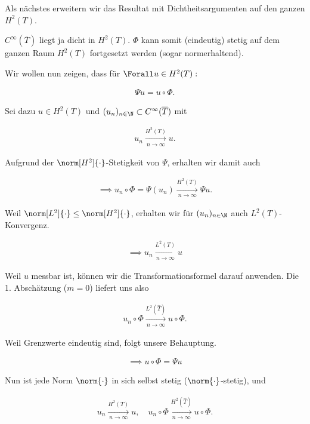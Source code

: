 \begin{solution}
Als nächstes erweitern wir das Resultat mit Dichtheitsargumenten auf den ganzen $H^2(T)$.

$C^{\infty}(\overline{T})$ liegt ja dicht in $H^2(T)$.
$\Phi$ kann somit (eindeutig) stetig auf dem ganzen Raum $H^2(T)$ fortgesetzt werden
(sogar normerhaltend).

Wir wollen nun zeigen, dass für $\Forall u \in H^2(T):$

\begin{align*}
  \Psi u = u \circ \Phi.
\end{align*}

Sei dazu $u \in H^2(T)$ und $(u_n)_{n \in \N} \subset C^{\infty}(\overline{T})$ mit

\begin{align*}
  u_n \xrightarrow[n \to \infty]{H^2(T)} u.
\end{align*}

Aufgrund der $\norm[H^2]{\cdot}$-Stetigkeit von $\Psi$, erhalten wir damit auch

\begin{align*}
  \implies
  u_n \circ \Phi = \Psi(u_n) \xrightarrow[n \to \infty]{H^2(T)} \Psi u.
\end{align*}

Weil $\norm[L^2]{\cdot} \leq \norm[H^2]{\cdot}$, erhalten wir für $(u_n)_{n \in \N}$ auch $L^2(T)$-Konvergenz.

\begin{align*}
  \implies
  u_n \xrightarrow[n \to \infty]{L^2(T)} u
\end{align*}

Weil $u$ messbar ist, können wir die Transformationsformel darauf anwenden.
Die 1. Abschätzung ($m = 0$) liefert uns also

\begin{align*}
  u_n \circ \Phi \xrightarrow[n \to \infty]{L^2(\hat T)} u \circ \Phi.
\end{align*}

Weil Grenzwerte eindeutig sind, folgt unsere Behauptung.

\begin{align*}
  \implies
  u \circ \Phi = \Psi u
\end{align*}

Nun ist jede Norm $\norm{\cdot}$ in sich selbst stetig ($\norm{\cdot}$-stetig), und

\begin{align*}
  u_n \xrightarrow[n \to \infty]{H^2(T)} u,
  \quad
  u_n \circ \Phi \xrightarrow[n \to \infty]{H^2(\hat T)} u \circ \Phi.
\end{align*}


\end{solution}
